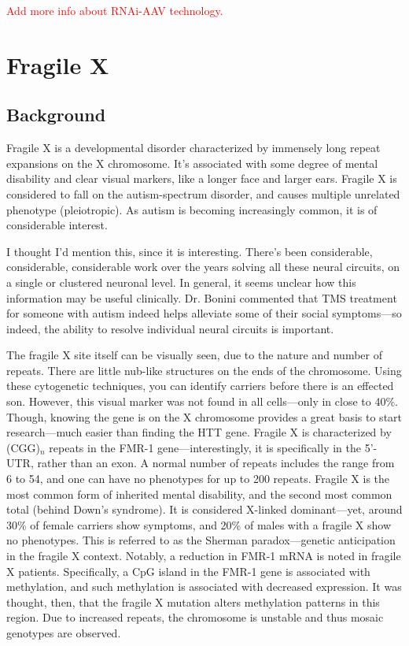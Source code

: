 \documentclass[12pt]{report}
\begin{document}
\textcolor{red}{Add more info about RNAi-AAV technology.}

\section{Fragile X}

\subsection{Background}

Fragile X is a developmental disorder characterized by immensely long repeat expansions on the X chromosome. It's associated with some degree of mental disability and clear visual markers, like a longer face and larger ears. Fragile X is considered to fall on the autism-spectrum disorder, and causes multiple unrelated phenotype (pleiotropic). As autism is becoming increasingly common, it is of considerable interest.\newline

I thought I'd mention this, since it is interesting. There's been considerable, considerable, considerable work over the years solving all these neural circuits, on a single or clustered neuronal level. In general, it seems unclear how this information may be useful clinically. Dr. Bonini commented that TMS treatment for someone with autism indeed helps alleviate some of their social symptoms---so indeed, the ability to resolve individual neural circuits is important.\newline

The fragile X site itself can be visually seen, due to the nature and number of repeats. There are little nub-like structures on the ends of the chromosome. Using these cytogenetic techniques, you can identify carriers before there is an effected son. However, this visual marker was not found in all cells---only in close to 40\%. Though, knowing the gene is on the X chromosome provides a great basis to start research---much easier than finding the HTT gene. Fragile X is characterized by (CGG)$_n$ repeats in the FMR-1 gene---interestingly, it is specifically in the 5'-UTR, rather than an exon. A normal number of repeats includes the range from 6 to 54, and one can have no phenotypes for up to 200 repeats. Fragile X is the most common form of inherited mental disability, and the second most common total (behind Down's syndrome). It is considered X-linked dominant---yet, around 30\% of female carriers show symptoms, and 20\% of males with a fragile X show no phenotypes. This is referred to as the Sherman paradox---genetic anticipation in the fragile X context. Notably, a reduction in FMR-1 mRNA is noted in fragile X patients. Specifically, a CpG island in the FMR-1 gene is associated with methylation, and such methylation is associated with decreased expression. It was thought, then, that the fragile X mutation alters methylation patterns in this region. Due to increased repeats, the chromosome is unstable and thus mosaic genotypes are observed.\newline
\end{document}
